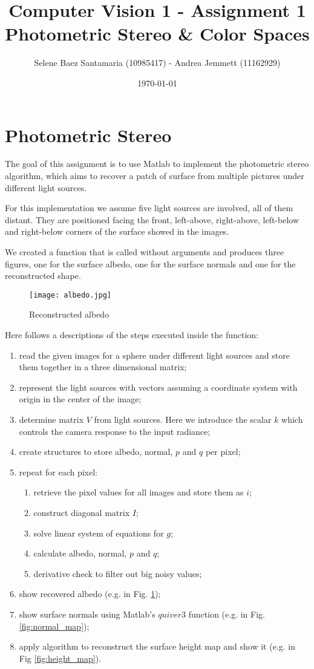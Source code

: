 \documentclass[11pt]{article}
\title{
	{Computer Vision 1 - Assignment 1 \\
	Photometric Stereo \& Color Spaces}
}
\author{
Selene Baez Santamaria (10985417) - Andrea Jemmett (11162929)}
\date{\today}
\begin{document}
\maketitle


\section{Photometric Stereo}
The goal of this assignment is to use Matlab to implement the photometric stereo algorithm, which aims to recover a patch of surface from multiple pictures under different light sources.

For this implementation we assume five light sources are involved, all of them distant.
They are positioned facing the front, left-above, right-above, left-below and right-below corners of the surface showed in the images.

We created a function that is called without arguments and produces three figures, one for the surface albedo, one for the surface normals and one for the reconstructed shape.

\begin{figure}[!htp]
    \centering
    \texttt{[image: albedo.jpg]}
    \caption{Reconstructed albedo}
    \label{fig:albedo}
\end{figure}

Here follows a descriptions of the steps executed inside the function:
\begin{enumerate}
	\item read the given images for a sphere under different light sources and store them together in a three dimensional matrix;
	\item represent the light sources with vectors assuming a coordinate system with origin in the center of the image;
	\item \label{item:k} determine matrix $V$ from light sources. Here we introduce the scalar $k$ which controls the camera response to the input radiance;
	\item create structures to store albedo, normal, $p$ and $q$ per pixel;
	\item repeat for each pixel:
	\begin{enumerate}
		\item retrieve the pixel values for all images and store them as $i$;
		\item construct diagonal matrix $I$; 
		\item solve linear system of equations for $g$;
		\item calculate albedo, normal, $p$ and $q$;
		\item \label{item:check} derivative check to filter out big noisy values;
	\end{enumerate}
	\item show recovered albedo (e.g. in Fig. \ref{fig:albedo});
	\item show surface normals using Matlab's $quiver3$ function (e.g. in Fig. \ref{fig:normal_map});
	\item apply algorithm to reconstruct the surface height map and show it (e.g. in Fig \ref{fig:height_map}).
\end{enumerate}
\end{document}
